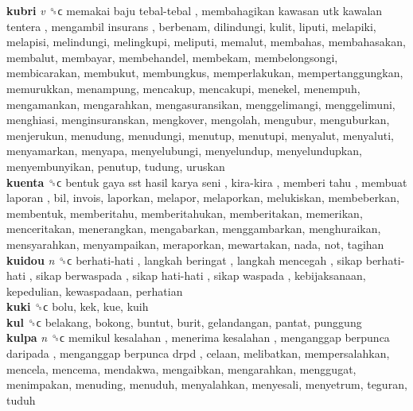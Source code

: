 \textbf{kubri} \emph{v}  ␝ϲ   memakai baju tebal-tebal ,  membahagikan kawasan utk kawalan tentera ,  mengambil insurans , berbenam, dilindungi, kulit, liputi, melapiki, melapisi, melindungi, melingkupi, meliputi, memalut, membahas, membahasakan, membalut, membayar, membehandel, membekam, membelongsongi, membicarakan, membukut, membungkus, memperlakukan, mempertanggungkan, memurukkan, menampung, mencakup, mencakupi, menekel, menempuh, mengamankan, mengarahkan, mengasuransikan, menggelimangi, menggelimuni, menghiasi, menginsuranskan, mengkover, mengolah, mengubur, menguburkan, menjerukun, menudung, menudungi, menutup, menutupi, menyalut, menyaluti, menyamarkan, menyapa, menyelubungi, menyelundup, menyelundupkan, menyembunyikan, penutup, tudung, uruskan  \\
\textbf{kuenta} ␝ϲ   bentuk gaya sst hasil karya seni ,  kira-kira ,  memberi tahu ,  membuat laporan , bil, invois, laporkan, melapor, melaporkan, melukiskan, membeberkan, membentuk, memberitahu, memberitahukan, memberitakan, memerikan, menceritakan, menerangkan, mengabarkan, menggambarkan, menghuraikan, mensyarahkan, menyampaikan, meraporkan, mewartakan, nada, not, tagihan  \\
\textbf{kuidou} \emph{n}  ␝ϲ   berhati-hati ,  langkah beringat ,  langkah mencegah ,  sikap berhati-hati ,  sikap berwaspada ,  sikap hati-hati ,  sikap waspada , kebijaksanaan, kepedulian, kewaspadaan, perhatian  \\
\textbf{kuki} ␝ϲ  bolu, kek, kue, kuih  \\
\textbf{kul} ␝ϲ  belakang, bokong, buntut, burit, gelandangan, pantat, punggung  \\
\textbf{kulpa} \emph{n}  ␝ϲ   memikul kesalahan ,  menerima kesalahan ,  menganggap berpunca daripada ,  menganggap berpunca drpd , celaan, melibatkan, mempersalahkan, mencela, mencema, mendakwa, mengaibkan, mengarahkan, menggugat, menimpakan, menuding, menuduh, menyalahkan, menyesali, menyetrum, teguran, tuduh  \\
